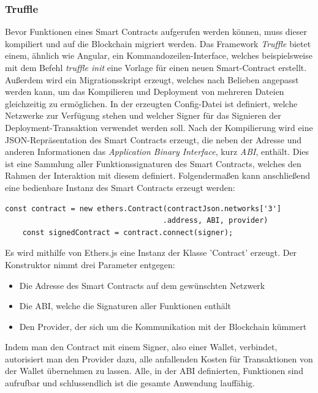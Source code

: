 \subsubsection{Truffle}
Bevor Funktionen eines Smart Contracts aufgerufen werden können, muss dieser kompiliert und auf die Blockchain migriert werden. Das Framework \emph{Truffle} bietet einem, ähnlich wie Angular, ein Kommandozeilen-Interface, welches beispielsweise mit dem Befehl \emph{truffle init} eine Vorlage für einen neuen Smart-Contract erstellt. Außerdem wird ein Migrationsskript erzeugt, welches nach Belieben angepasst werden kann, um das Kompilieren und Deployment von mehreren Dateien gleichzeitig zu ermöglichen. In der erzeugten Config-Datei ist definiert, welche Netzwerke zur Verfügung stehen und welcher Signer für das Signieren der Deployment-Transaktion verwendet werden soll. Nach der Kompilierung wird eine JSON-Repräsentation des Smart Contracts erzeugt, die neben der Adresse und anderen Informationen das \emph{Application Binary Interface}, kurz \emph{ABI}, enthält. Dies ist eine Sammlung aller Funktionssignaturen des Smart Contracts, welches den Rahmen der Interaktion mit diesem definiert.
Folgendermaßen kann anschließend eine bedienbare Instanz des Smart Contracts erzeugt werden: 
\begin{lstlisting}[caption={Erzeugen eines aufrufbaren Smart Contracts},captionpos=b]
	const contract = new ethers.Contract(contractJson.networks['3']
									.address, ABI, provider)
	const signedContract = contract.connect(signer);
\end{lstlisting}
Es wird mithilfe von Ethers.js eine Instanz der Klasse 'Contract' erzeugt. Der Konstruktor nimmt drei Parameter entgegen:
\begin{itemize}
	\item Die Adresse des Smart Contracts auf dem gewünschten Netzwerk
	\item Die ABI, welche die Signaturen aller Funktionen enthält
	\item Den Provider, der sich um die Kommunikation mit der Blockchain kümmert
\end{itemize}
Indem man den Contract mit einem Signer, also einer Wallet, verbindet, autorisiert man den Provider dazu, alle anfallenden Kosten für Transaktionen von der Wallet übernehmen zu lassen. Alle, in der ABI definierten, Funktionen sind aufrufbar und schlussendlich ist die gesamte Anwendung lauffähig.

